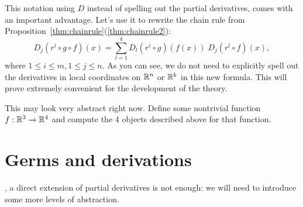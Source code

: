 This notation using $D$ instead of spelling out the partial derivatives, comes with an important advantage.
Let's use it to rewrite the chain rule from Proposition~\ref{thm:chainrule}(\ref{thm:chainrule2}):
\begin{equation}
  D_j(r^i\circ g \circ f) (x) = \sum_{l=1}^k D_l(r^i\circ g)(f(x))\; D_j(r^l \circ f)(x),
\end{equation}
where $1\leq i\leq m, 1\leq j \leq n$.
As you can see, we do not need to explicitly spell out the derivatives in local coordinates on $\mathbb{R}^n$ or $\mathbb{R}^k$ in this new formula.
This will prove extremely convenient for the development of the theory.

\begin{exercise}
  This may look very abstract right now.
  Define some nontrivial function $f: \mathbb{R}^3 \to \mathbb{R}^4$ and compute the 4 objects described above for that function.
\end{exercise}

\section{Germs and derivations}

, a direct extension of partial derivatives is not enough: we will need to introduce some more levels of abstraction.

